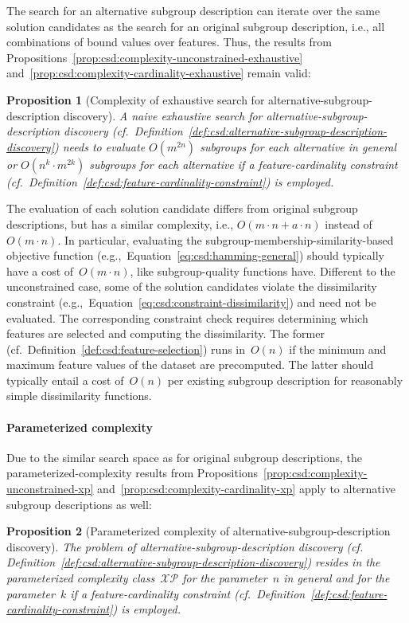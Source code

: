 \documentclass{article}
\newtheorem{proposition}{Proposition}
\theoremstyle{definition}
\begin{document}
The search for an alternative subgroup description can iterate over the same solution candidates as the search for an original subgroup description, i.e., all combinations of bound values over features.
Thus, the results from Propositions~\ref{prop:csd:complexity-unconstrained-exhaustive} and~\ref{prop:csd:complexity-cardinality-exhaustive} remain valid:
%
\begin{proposition}[Complexity of exhaustive search for alternative-subgroup-description discovery]
	A naive exhaustive search for alternative-subgroup-descrip\-tion discovery (cf.~Definition~\ref{def:csd:alternative-subgroup-description-discovery})
	needs to evaluate $O(m^{2n})$ subgroups for each alternative in general or $O(n^k \cdot m^{2k})$ subgroups for each alternative if a feature-cardinality constraint (cf.~Definition~\ref{def:csd:feature-cardinality-constraint}) is employed.
	\label{prop:csd:complexity-alternatives-exhaustive}
\end{proposition}
%
The evaluation of each solution candidate differs from original subgroup descriptions, but has a similar complexity, i.e., $O(m \cdot n + a \cdot n)$ instead of~$O(m \cdot n)$.
In particular, evaluating the subgroup-membership-similarity-based objective function (e.g.,~Equation~\ref{eq:csd:hamming-general}) should typically have a cost of~$O(m \cdot n)$, like subgroup-quality functions have.
Different to the unconstrained case, some of the solution candidates violate the dissimilarity constraint (e.g.,~Equation~\ref{eq:csd:constraint-dissimilarity}) and need not be evaluated.
The corresponding constraint check requires determining which features are selected and computing the dissimilarity.
The former (cf.~Definition~\ref{def:csd:feature-selection}) runs in~$O(n)$ if the minimum and maximum feature values of the dataset are precomputed.
The latter should typically entail a cost of~$O(n)$ per existing subgroup description for reasonably simple dissimilarity functions.

\paragraph{Parameterized complexity}

Due to the similar search space as for original subgroup descriptions, the parameterized-complexity results from Propositions~\ref{prop:csd:complexity-unconstrained-xp} and~\ref{prop:csd:complexity-cardinality-xp} apply to alternative subgroup descriptions as well:
\begin{proposition}[Parameterized complexity of alternative-subgroup-description discovery]
	The problem of alternative-subgroup-description discovery (cf. Definition~\ref{def:csd:alternative-subgroup-description-discovery}) resides in the parameterized complexity class~$\mathcal{XP}$ for the parameter~$n$ in general and for the parameter~$k$ if a feature-cardinality constraint (cf.~Definition~\ref{def:csd:feature-cardinality-constraint}) is employed.
	\label{prop:csd:complexity-alternatives-xp}
\end{proposition}
\end{document}
